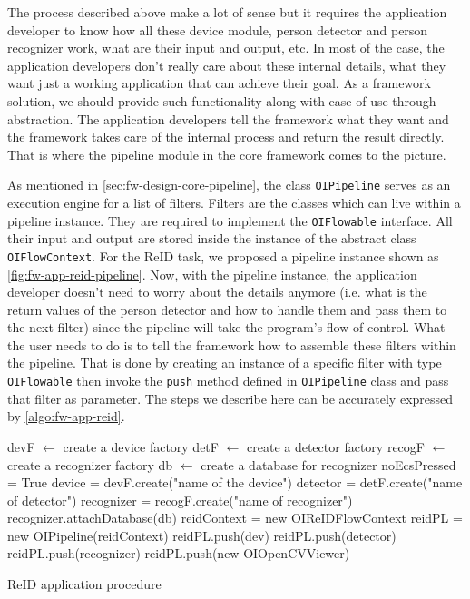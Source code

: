 The process described above make a lot of sense but it requires the application 
developer to know how all these device module, person detector and person 
recognizer work, what are their input and output, etc. In most of the case, the 
application developers don't really care about these internal details, what 
they want just a working application that can achieve their goal. As a 
framework solution, we should provide such functionality along with ease of use through abstraction. 
The application developers tell the framework what they want and the framework takes care of 
the internal process and return the result directly. That is where the pipeline 
module in the core framework comes to the picture.

As mentioned in \autoref{sec:fw-design-core-pipeline}, the class 
\texttt{OIPipeline} serves as an execution engine for a list of filters.
Filters are the classes which can live within a pipeline instance. They are 
required to implement the \texttt{OIFlowable} interface. All their input and 
output are stored inside the instance of the abstract class 
\texttt{OIFlowContext}.
For the ReID task, we proposed a pipeline instance shown as
\autoref{fig:fw-app-reid-pipeline}. Now, with the pipeline instance, the 
application developer doesn't need to worry about the details anymore
(i.e. what is the return values of the person detector and how to handle them 
and pass them to the next filter) 
since the pipeline will take the program's flow of control.
What the user needs to do is to tell the framework how to assemble these 
filters within the pipeline. That is done by creating an instance of a specific 
filter with type \texttt{OIFlowable} then invoke the \texttt{push} method 
defined in \texttt{OIPipeline} class and pass that filter as parameter.
The steps we describe here can be accurately expressed by
\autoref{algo:fw-app-reid}.

\begin{algorithm}
    devF $\leftarrow$ create a device factory\;
    detF $\leftarrow$ create a detector factory\;
    recogF $\leftarrow$ create a recognizer factory\;
    db $\leftarrow$ create a database for recognizer\;
    \;
    noEcsPressed = True\;
    device = devF.create("name of the device")\;
    detector = detF.create("name of detector")\;
    recognizer = recogF.create("name of recognizer")\;
     recognizer.attachDatabase(db)\;
    \;
    reidContext = new OIReIDFlowContext \;
    reidPL = new OIPipeline(reidContext) \;
    reidPL.push(dev)\;
    reidPL.push(detector)\;
    reidPL.push(recognizer)\;
    reidPL.push(new OIOpenCVViewer)\;
    \;
    \caption{ReID application procedure}
    \label{algo:fw-app-reid}
\end{algorithm}

